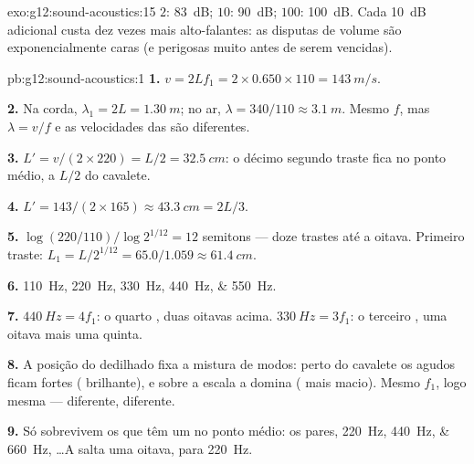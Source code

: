 \begin{solution}{exo:g12:sound-acoustics:15}
$2$: \qty{83}{dB}; $10$: \qty{90}{dB}; $100$: \qty{100}{dB}. Cada
\qty{+10}{dB} adicional custa dez vezes mais alto-falantes: as disputas
de volume são exponencialmente caras (e perigosas muito antes de serem
vencidas).
\end{solution}

\begin{solution}{pb:g12:sound-acoustics:1}
\textbf{1.} $v = 2Lf_1 = 2 \times 0.650 \times 110 = \qty{143}{m/s}$.

\textbf{2.} Na corda, $\lambda_1 = 2L = \qty{1.30}{m}$; no ar,
$\lambda = 340/110 \approx \qty{3.1}{m}$. Mesmo $f$, mas
$\lambda = v/f$ e as velocidades das  são diferentes.

\textbf{3.} $L' = v/(2 \times 220) = L/2 = \qty{32.5}{cm}$: o décimo
segundo traste fica no ponto médio, a $L/2$ do cavalete.

\textbf{4.} $L' = 143/(2 \times 165) \approx \qty{43.3}{cm} = 2L/3$.

\textbf{5.} $\log(220/110)/\log 2^{1/12} = 12$ semitons --- doze trastes
até a oitava. Primeiro traste:
$L_1 = L/2^{1/12} = 65.0/1.059 \approx \qty{61.4}{cm}$.

\textbf{6.} \qtylist{110;220;330;440;550}{Hz}.

\textbf{7.} $\qty{440}{Hz} = 4f_1$: o quarto , duas oitavas
acima. $\qty{330}{Hz} = 3f_1$: o terceiro , uma oitava mais uma
quinta.

\textbf{8.} A posição do dedilhado fixa a mistura de modos: perto do
cavalete os  agudos ficam fortes ( brilhante), e sobre
a escala a  domina ( mais macio). Mesmo $f_1$, logo mesma
 ---  diferente,  diferente.

\textbf{9.} Só sobrevivem os  que têm um  no ponto médio: os
pares, \qtylist{220;440;660}{Hz}, \dots A  salta uma oitava, para
\qty{220}{Hz}.


\end{solution}
